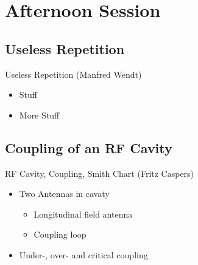 \documentclass{beamer}
\begin{document}
\section{Afternoon Session}
\subsection{Useless Repetition}
\begin{frame}[t,fragile]{Useless Repetition (Manfred Wendt)}
\begin{itemize}
\item Stuff
\item More Stuff
\end{itemize}
\end{frame}

\subsection{Coupling of an RF Cavity}
\begin{frame}[t,fragile]{RF Cavity, Coupling, Smith Chart (Fritz Caspers)}
\begin{itemize}
\item  Two Antennas in cavaty
\begin{itemize}
\item Longitudinal field antenna
\item Coupling loop
\end{itemize}
\item Under-, over- and critical coupling
\end{itemize}
\end{frame}
\end{document}
